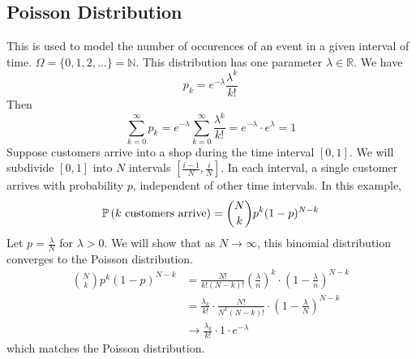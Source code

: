 \documentclass{article}
\begin{document}
\subsection{Poisson Distribution}
This is used to model the number of occurences of an event in a given interval of time. $\Omega = \{ 0, 1, 2, \dots \} = \mathbb N$. This distribution has one parameter $\lambda \in \mathbb R$. We have
\[ p_k = e^{-\lambda} \frac{\lambda^k}{k!} \]
Then
\[ \sum_{k=0}^\infty p_k = e^{-\lambda}  \sum_{k=0}^\infty \frac{\lambda^k}{k!} = e^{-\lambda} \cdot e^{\lambda} = 1 \]
Suppose customers arrive into a shop during the time interval $[0, 1]$. We will subdivide $[0, 1]$ into $N$ intervals $\left[ \frac{i-1}{N}, \frac{i}{N} \right]$. In each interval, a single customer arrives with probability $p$, independent of other time intervals. In this example,
\[ \mathbb{P}\left({k \text{ customers arrive}}\right) = \binom{N}{k} p^k (1-p)^{N-k} \]
Let $p = \frac{\lambda}{N}$ for $\lambda > 0$. We will show that as $N \to \infty$, this binomial distribution converges to the Poisson distribution.
\begin{align*}
	\binom{N}{k} p^k (1-p)^{N-k} & = \frac{N!}{k!(N-k)!} \left( \frac{\lambda}{n} \right)^k \cdot \left( 1 - \frac{\lambda}{n} \right)^{N-k} \\
	                             & = \frac{\lambda_k}{k!} \cdot \frac{N!}{N^k(N-k)!} \cdot \left( 1 - \frac{\lambda}{N} \right)^{N-k}        \\
	                             & \to \frac{\lambda_k}{k!} \cdot 1 \cdot e^{-\lambda}
\end{align*}
which matches the Poisson distribution.
\end{document}
